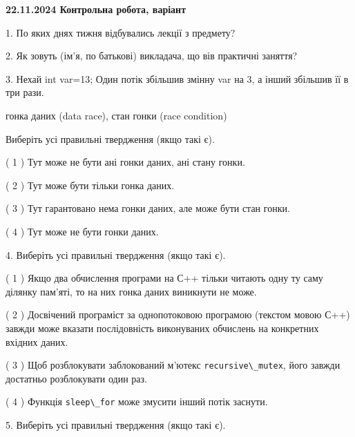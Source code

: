 \documentclass[12pt, ukrainian]{article}
\def\code#1{\Verb!#1!}
\begin{document}
\vspace{4mm}
\newpage
\begin {large}

\textbf{22.11.2024 Контрольна робота, варіант  }\par


{
1. По яких днях тижня відбувались лекції з предмету?



\vspace{5mm}
2. Як зовуть (ім'я, по батькові) викладача, що вів практичні заняття?



\vspace{5mm}
3. Нехай int var=13; Один потік збільшив змінну var на 3, а інший збільшив її в три рази.

гонка даних (data race), стан гонки (race condition)

Виберіть усі правильні твердження (якщо такі є).\par
\vspace{2mm}
( 1 ) Тут може не бути ані гонки даних, ані стану гонки.%

( 2 ) Тут може бути тільки гонка даних.%

( 3 ) Тут гарантовано нема гонки даних, але може бути стан гонки.%

( 4 ) Тут може не бути гонки даних.%


\vspace{5mm}
4. Виберіть усі правильні твердження (якщо такі є).\par
\vspace{2mm}

( 1 ) Якщо два обчислення програми на С++ тільки читають одну ту саму ділянку пам'яті, то на них гонка даних  виникнути не може.%

( 2 ) Досвічений програміст за однопотоковою програмою (текстом мовою С++) завжди може вказати послідовність виконуваних обчислень на конкретних вхідних даних.%

( 3 ) Щоб розблокувати заблокований м’ютекс \code{recursive\_mutex}, його завжди достатньо розблокувати один раз.%

( 4 ) Функція \code{sleep\_for} може змусити інший потік заснути.%


\vspace{5mm}
5. Виберіть усі правильні твердження (якщо такі є).\par
\vspace{2mm}

}
\end{large}
\end{document}
